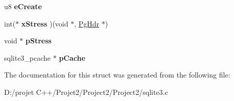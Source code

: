 \begin{DoxyCompactItemize}
u8 {\bfseries e\+Create}
\item 
\mbox{\label{struct_p_cache_a51b67ce6c17cbd7124c50d8a2d0fed50}} 
int($\ast$ {\bfseries x\+Stress} )(void $\ast$, \mbox{\hyperlink{struct_pg_hdr}{Pg\+Hdr}} $\ast$)
\item 
\mbox{\label{struct_p_cache_af04a2ea8a2c6d6b3eea7bb7051b8f447}} 
void $\ast$ {\bfseries p\+Stress}
\item 
\mbox{\label{struct_p_cache_ad0248655d30d327e0eeced6c3651b161}} 
sqlite3\+\_\+pcache $\ast$ {\bfseries p\+Cache}
\end{DoxyCompactItemize}


The documentation for this struct was generated from the following file\+:\begin{DoxyCompactItemize}
\item 
D\+:/projet C++/\+Projet2/\+Project2/\+Project2/sqlite3.\+c\end{DoxyCompactItemize}
